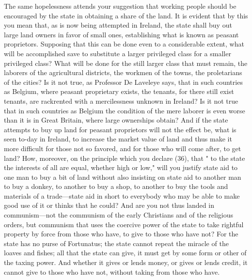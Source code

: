 \documentclass{book}
\begin{document}
The same hopelessness attends your suggestion that working people should be encouraged by the state in obtaining a share of the land. It is evident that by this you mean that, as is now being attempted in Ireland, the state shall buy out large land owners in favor of small ones, establishing what is known as peasant proprietors. Supposing that this can be done even to a considerable extent, what will be accomplished save to substitute a larger privileged class for a smaller privileged class? What will be done for the still larger class that must remain, the laborers of the agricultural districts, the workmen of the towns, the proletarians of the cities? Is it not true, as Professor De Laveleye says, that in such countries as Belgium, where peasant proprietary exists, the tenants, for there still exist tenants, are rackrented with a mercilessness unknown in Ireland? Is it not true that in such countries as Belgium the condition of the mere laborer is even worse than it is in Great Britain, where large ownerships obtain? And if the state attempts to buy up land for peasant proprietors will not the effect be, what is seen to-day in Ireland, to increase the market value of land and thus make it more difficult for those not so favored, and for those who will come after, to get land? How, moreover, on the principle which you declare (36), that " to the state the interests of all are equal, whether high or low," will you justify state aid to one man to buy a bit of land without also insisting on state aid to another man to buy a donkey, to another to buy a shop, to another to buy the tools and materials of a trade—state aid in short to everybody who may be able to make good use of it or thinks that he could? And are you not thus landed in communism—not the communism of the early Christians and of the religious orders, but communism that uses the coercive power of the state to take rightful property by force from those who have, to give to those who have not? For the state has no purse of Fortunatus; the state cannot repeat the miracle of the loaves and fishes; all that the state can give, it must get by some form or other of the taxing power. And whether it gives or lends money, or gives or lends credit, it cannot give to those who have not, without taking from those who have.
\end{document}
